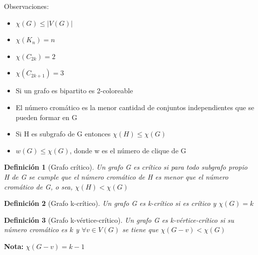 \documentclass[a4paper,1pt]{report}
\newtheorem*{dfn}{Definición}
\begin{document}
Observaciones:
\begin{itemize}
 \item $\chi(G) \leq |V(G)|$
 \item $\chi (K_n)=n$
 \item $\chi (C_{2k})=2$
 \item $\chi (C_{2k+1})=3$
 \item Si un grafo es bipartito es 2-coloreable
 \item El número cromático es la menor cantidad de conjuntos independientes que se pueden formar en G
 \item Si H es subgrafo de G entonces $\chi (H)\leq \chi (G)$
 \item $w(G)\leq \chi (G)$, donde w es el número de clique de G
\end{itemize}

\begin{dfn}[Grafo cr\'itico]
 Un grafo G es cr\'itico si para todo subgrafo propio H de G se cumple que el n\'umero 
 crom\'atico de H es menor que el n\'umero crom\'atico de G, o sea, $\chi (H)<\chi (G)$
\end{dfn}

\begin{dfn}[Grafo k-cr\'itico]
 Un grafo G es k-cr\'itico si es crítico y $\chi (G)=k$
\end{dfn}


\begin{dfn}[Grafo k-v\'ertice-cr\'itico]
 Un grafo G es k-v\'ertice-cr\'itico si su n\'umero crom\'atico es $k$ y $\forall v\in V(G)$ se tiene que $\chi (G-v)<\chi (G)$
\end{dfn}

\textbf{Nota:} $\chi (G-v)=k-1$
\end{document}

